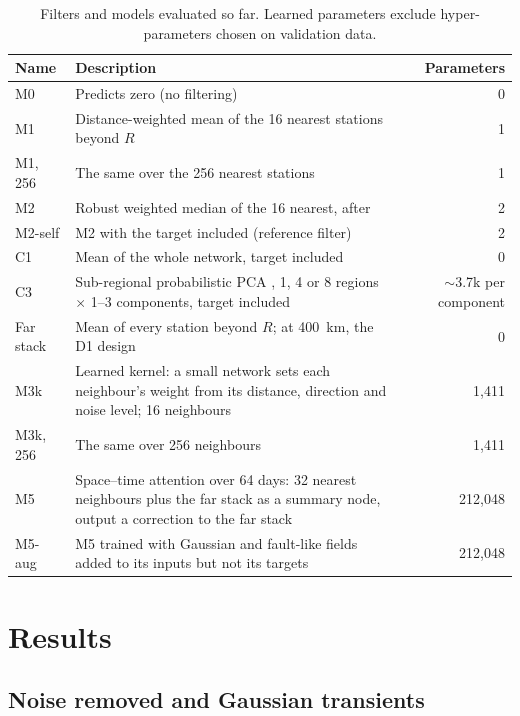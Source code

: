 \documentclass[11pt,a4paper]{article}
\begin{document}
\begin{table}[ht]
\centering
\small
\caption{Filters and models evaluated so far. Learned parameters exclude hyper-parameters chosen on validation data.}
\label{tab:models}
\begin{tabular}{p{2.4cm}p{8.9cm}r}
\toprule
Name & Description & Parameters \\
\midrule
M0 & Predicts zero (no filtering) & 0 \\
M1 & Distance-weighted mean of the 16 nearest stations beyond $R$ & 1 \\
M1, 256 & The same over the 256 nearest stations & 1 \\
M2 & Robust weighted median of the 16 nearest, after \citet{kreemer2021} & 2 \\
M2-self & M2 with the target included (reference filter) & 2 \\
C1 & Mean of the whole network, target included \citep{wdowinski1997} & 0 \\
C3 & Sub-regional probabilistic PCA \citep{tipping1999,gruszczynski2018,liu2026}, 1, 4 or 8 regions $\times$ 1--3 components, target included & $\sim$3.7k per component \\
Far stack & Mean of every station beyond $R$; at 400~km, the D1 design & 0 \\
M3k & Learned kernel: a small network sets each neighbour's weight from its distance, direction and noise level; 16 neighbours & 1,411 \\
M3k, 256 & The same over 256 neighbours & 1,411 \\
M5 & Space--time attention over 64 days: 32 nearest neighbours plus the far stack as a summary node, output a correction to the far stack & 212,048 \\
M5-aug & M5 trained with Gaussian and fault-like fields added to its inputs but not its targets & 212,048 \\
\bottomrule
\end{tabular}
\end{table}

\section{Results}

\subsection{Noise removed and Gaussian transients}
\end{document}
